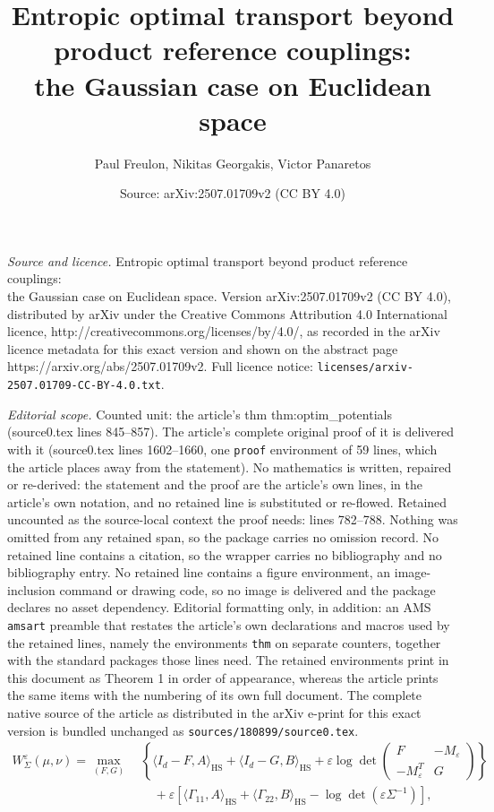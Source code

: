 \documentclass[10pt,a4paper]{amsart}
\title{Entropic optimal transport beyond product reference couplings:\\ the Gaussian case on Euclidean space}
\author{Paul Freulon, Nikitas Georgakis, Victor Panaretos}
\date{Source: arXiv:2507.01709v2 (CC BY 4.0)}
\DeclareMathOperator{\HS}{HS}
\begin{document}
\maketitle

\noindent\emph{Source and licence.} Entropic optimal transport beyond product reference couplings:\\ the Gaussian case on Euclidean space. Version arXiv:2507.01709v2 (CC BY 4.0), distributed by arXiv under the Creative Commons Attribution 4.0 International licence, http://creativecommons.org/licenses/by/4.0/, as recorded in the arXiv licence metadata for this exact version and shown on the abstract page https://arxiv.org/abs/2507.01709v2. Full licence notice: \texttt{licenses/arxiv-2507.01709-CC-BY-4.0.txt}.\par\smallskip

\noindent\textit{Editorial scope.} Counted unit: the article's thm thm:optim\_potentials (source0.tex lines 845--857). The article's complete original proof of it is delivered with it (source0.tex lines 1602--1660, one \texttt{proof} environment of 59 lines, which the article places away from the statement). No mathematics is written, repaired or re-derived: the statement and the proof are the article's own lines, in the article's own notation, and no retained line is substituted or re-flowed.  Retained uncounted as the source-local context the proof needs: lines 782--788.  Nothing was omitted from any retained span, so the package carries no omission record.  No retained line contains a citation, so the wrapper carries no bibliography and no bibliography entry.  No retained line contains a figure environment, an image-inclusion command or drawing code, so no image is delivered and the package declares no asset dependency.  Editorial formatting only, in addition: an AMS \texttt{amsart} preamble that restates the article's own declarations and macros used by the retained lines, namely the environments \texttt{thm} on separate counters, together with the standard packages those lines need.  The retained environments print in this document as Theorem 1 in order of appearance, whereas the article prints the same items with the numbering of its own full document.  The complete native source of the article as distributed in the arXiv e-print for this exact version is bundled unchanged as \texttt{sources/180899/source0.tex}.
    \begin{align}\label{eq:duality_OTGauss}
        W_\Sigma^\varepsilon(\mu, \nu) =  \max_{(F,G)}  ~& \left\{\langle I_d-F, A \rangle_{\HS}  + \langle I_d -G, B \rangle_{\HS} 
          + \varepsilon \log  \det \begin{pmatrix}
         F    & -M_{\varepsilon}    \\
    -M_{\varepsilon}^T&    G 
    \end{pmatrix} \right\}\\ & \quad +  \varepsilon \left[ \langle \Gamma_{11}, A \rangle_{\HS} + \langle \Gamma_{22}, B \rangle_{\HS} -\log \det(\varepsilon \Sigma^{-1})\right], \nonumber
    \end{align}
\end{document}
